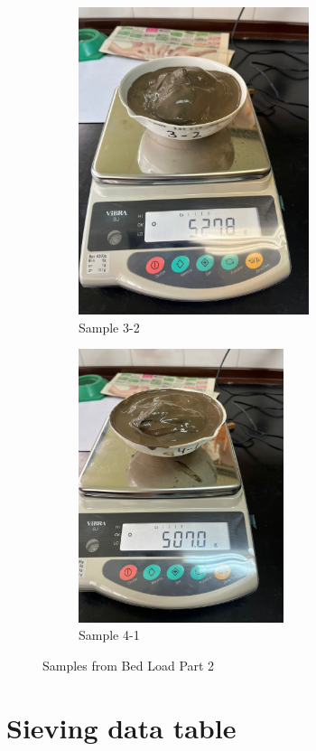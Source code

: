 \begin{figure}[H]
    \begin{subfigure}[b]{0.48\textwidth}
        \includegraphics[width=\linewidth, height =9cm]{figures/appendix-f/3-2.jpg}
        \caption{Sample 3-2}
        \label{fig:second}
    \end{subfigure}
    \hfill
    \begin{subfigure}[b]{0.48\textwidth}
        \includegraphics[width=\linewidth, height =8cm]{figures/appendix-f/4-1.jpg}
        \caption{Sample 4-1}
        \label{fig:second}
    \end{subfigure}

    \caption{Samples from Bed Load Part 2}
    \label{fig:all four 2}
\end{figure}

\section{Sieving data table}


